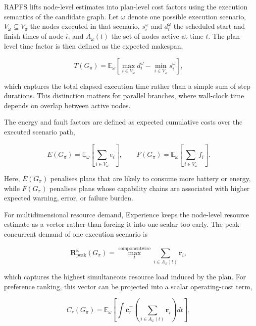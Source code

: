 \documentclass[letterpaper, 10pt, conference]{ieeeconf}
\begin{document}
RAPFS lifts node-level estimates into plan-level cost factors using the execution semantics of the candidate graph. Let $\omega$ denote one possible execution scenario, $V_{\omega}\subseteq V_{\pi}$ the nodes executed in that scenario, $s_i^{\omega}$ and $d_i^{\omega}$ the scheduled start and finish times of node $i$, and $A_{\omega}(t)$ the set of nodes active at time $t$. The plan-level time factor is then defined as the expected makespan,

\begin{equation}
T(G_{\pi})=
\mathbb{E}_{\omega}\left[
\max_{i\in V_{\omega}} d_i^{\omega}
-
\min_{i\in V_{\omega}} s_i^{\omega}
\right],
\end{equation}

which captures the total elapsed execution time rather than a simple sum of step durations. This distinction matters for parallel branches, where wall-clock time depends on overlap between active nodes.

The energy and fault factors are defined as expected cumulative costs over the executed scenario path,

\begin{equation}
E(G_{\pi})=\mathbb{E}_{\omega}\left[\sum_{i\in V_{\omega}} e_i\right],
\qquad
F(G_{\pi})=\mathbb{E}_{\omega}\left[\sum_{i\in V_{\omega}} f_i\right].
\end{equation}

Here, $E(G_{\pi})$ penalises plans that are likely to consume more battery or energy, while $F(G_{\pi})$ penalises plans whose capability chains are associated with higher expected warning, error, or failure burden.

For multidimensional resource demand, Experience keeps the node-level resource estimate as a vector rather than forcing it into one scalar too early. The peak concurrent demand of one execution scenario is

\begin{equation}
\mathbf{R}_{\mathrm{peak}}^{\omega}(G_{\pi})=
\max_{t}^{\mathrm{componentwise}}
\sum_{i\in A_{\omega}(t)} \mathbf{r}_i,
\end{equation}

which captures the highest simultaneous resource load induced by the plan. For preference ranking, this vector can be projected into a scalar operating-cost term,

\begin{equation}
C_r(G_{\pi})=
\mathbb{E}_{\omega}\left[
\int \mathbf{c}_r^{\top}
\left(\sum_{i\in A_{\omega}(t)} \mathbf{r}_i\right) dt
\right],
\end{equation}
\end{document}
